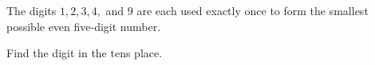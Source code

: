 The digits $1,2,3,4,$ and $9$ are each used exactly once to form the smallest possible even five-digit number.



Find the digit in the tens place.
